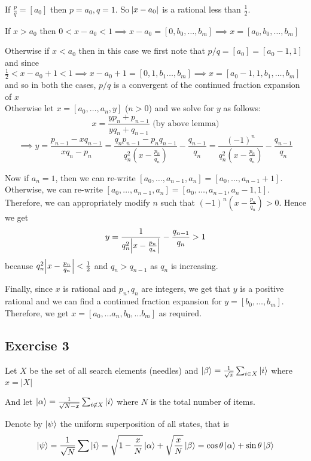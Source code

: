 \documentclass{article}
\begin{document}
If $\frac{p}{q} = [a_0]$ then $p=a_0, q=1$. So $\abs{x-a_0}$ is a rational less than $\frac12$. 

If $x > a_0$ then $0 < x-a_0 < 1 \implies x-a_0 = [0,b_0,\ldots, b_m] \implies x = [a_0,b_0,\ldots, b_m]$ 

Otherwise if $x < a_0$ then in this case we first note that $p/q = [a_0] = [a_0 - 1, 1]$ and since $\frac12 < x-a_0 + 1 < 1 \implies x - a_0 + 1 = [0,1,b_1\ldots, b_m] \implies x = [a_0-1,1,b_1,\ldots, b_m]$ and so in both the cases, $p/q$ is a convergent of the continued fraction expansion of $x$ \\

Otherwise let $x = [a_0, \ldots, a_n, y]$ ($n>0$) and we solve for $y$ as follows:
$$x = \frac{yp_n + p_{n-1}}{yq_n + q_{n-1}} \text{ (by above lemma)}$$ $$\implies y = \frac{p_{n-1}-xq_{n-1}}{xq_n - p_n} = \frac{q_np_{n-1}-p_nq_{n-1}}{q_n^2(x - \frac{p_n}{q_n})} - \frac{q_{n-1}}{q_n} = \frac{(-1)^n}{q_n^2(x - \frac{p_n}{q_n})} - \frac{q_{n-1}}{q_n}$$

Now if $a_n = 1$, then we can re-write $[a_0, \ldots, a_{n-1}, a_n] = [a_0, \ldots, a_{n-1} + 1]$. Otherwise, we can re-write $[a_0, \ldots, a_{n-1}, a_n] = [a_0, \ldots, a_{n-1}, a_n-1, 1]$. Therefore, we can appropriately modify $n$ such that $(-1)^n\left(x - \frac{p_n}{q_n}\right) > 0$. Hence we get 
$$y = \frac{1}{q_n^2\abs{x - \frac{p_n}{q_n}}} - \frac{q_{n-1}}{q_n} > 1$$
because $q_n^2\abs{x - \frac{p_n}{q_n}} < \frac12$ and $q_n > q_{n-1}$ as $q_n$ is increasing.

Finally, since $x$ is rational and $p_n, q_n$ are integers, we get that $y$ is a positive rational and we can find a continued fraction expansion for $y = [b_0, \ldots, b_m]$. Therefore, we get $x = [a_0, \ldots a_n, b_0, \ldots b_m]$ as required.





\subsection*{Exercise 3}
Let $X$ be the set of all search elements (needles) and $\ket \beta = \frac{1}{\sqrt x} \sum_{i \in X} \ket i$ where $x = |X|$

And let $\ket \alpha = \frac{1}{\sqrt{N-x}} \sum_{i \not \in X} \ket i$ where $N$ is the total number of items.

Denote by $\ket \psi$ the uniform superposition of all states, that is
$$\ket \psi = \frac{1}{\sqrt N} \sum \ket i = \sqrt{1 - \frac x N} \ket \alpha + \sqrt{\frac x N} \ket \beta = \cos \theta \ket \alpha + \sin \theta \ket \beta$$
\end{document}
